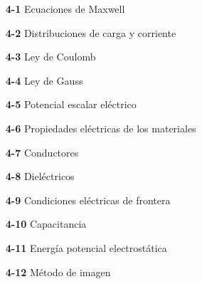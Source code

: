 \begin{minipage}[c]{0.6\textwidth}
\begin{flushleft}
        \begin{minipage}{0.6\textwidth} %
        \raggedright
        \linespread{1.5}\selectfont %
            \begin{itemize}
                \item[\textbf{4-1}] Ecuaciones de Maxwell
                \item[\textbf{4-2}] Distribuciones de carga y corriente
                \item[\textbf{4-3}] Ley de Coulomb
                \item[\textbf{4-4}] Ley de Gauss
                \item[\textbf{4-5}] Potencial escalar eléctrico
                \item[\textbf{4-6}] Propiedades eléctricas de los materiales
                \item[\textbf{4-7}] Conductores
                \item[\textbf{4-8}] Dieléctricos
                \item[\textbf{4-9}] Condiciones eléctricas de frontera
                \item[\textbf{4-10}] Capacitancia
                \item[\textbf{4-11}] Energía potencial electrostática
                \item[\textbf{4-12}] Método de imagen
            \end{itemize}
        \end{minipage}

        \vspace*{\fill} %
    \end{flushleft}
\end{minipage}

\newpage %

